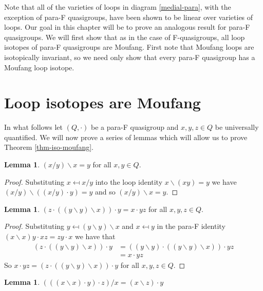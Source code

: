 \documentclass[12pt, twoside, openright]{report}
\theoremstyle{definition}
\newtheorem{lem}[thm]{Lemma}
\newcommand{\ldv}{\backslash}       %
\newcommand{\rdv}{/}                %
\begin{document}
Note that all of the varieties of loops in diagram \ref{medial-para}, with the exception of para-F
  quasigroups, have been shown to be linear over varieties of loops. Our goal in this chapter will
  be to prove an analogous result for para-F quasigroups. We will first show that as in the case of
  F-quasigroups, all loop isotopes of para-F quasigroups are Moufang. First note that Moufang loops
  are isotopically invariant, so we need only show that every para-F quasigroup has a Moufang loop isotope.

\section{Loop isotopes are Moufang}

In what follows let $(Q, \cdot)$ be a para-F quasigroup and $x, y, z\in Q$ be universally quantified.
  We will now prove a series of lemmas which will allow us to prove Theorem \ref{thm-iso-moufang}.

\begin{lem}\label{lem-divs}
  $(x\rdv y)\ldv x = y$ for all $x, y\in Q$.
\end{lem}

\begin{proof}
  Substituting $x \mapsfrom x/y$ into the loop identity $x\ldv(xy) = y$ we have
    $(x/y)\ldv((x/y)\cdot y) = y$ and so $(x/y)\ldv x = y$.
\end{proof}

\begin{lem}\label{M-15}
  $(z\cdot((y\ldv y)\ldv x))\cdot y = x\cdot yz$ for all $x, y, z\in Q$.
\end{lem}

\begin{proof}
  Substituting $y \mapsfrom (y\ldv y)\ldv x$ and $x \mapsfrom y$ in the para-F identity
    $(x\ldv x)y \cdot xz = zy\cdot x$ we have that
  \begin{align*}
    (z\cdot ((y\ldv y)\ldv x))\cdot y &= ((y\ldv y)\cdot((y\ldv y)\ldv x))\cdot yz\\
    &= x\cdot yz
  \end{align*}
  So $x\cdot yz = (z\cdot ((y\ldv y)\ldv x))\cdot y$ for all $x, y, z\in Q$.
\end{proof}

\begin{lem}\label{M-23}
  $(((x\ldv x)\cdot y)\cdot z)/x = (x\ldv z)\cdot y$
\end{lem}
\end{document}
